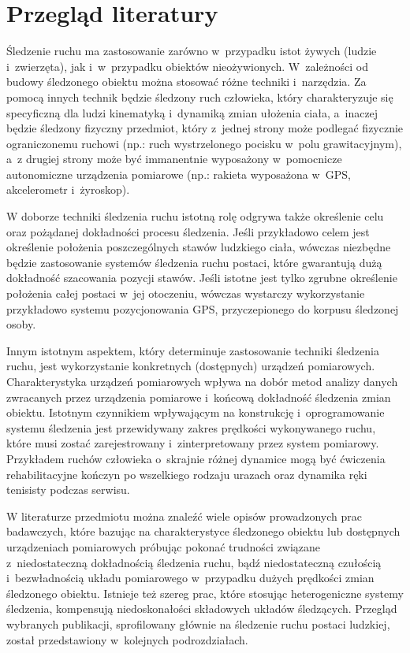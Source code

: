 \chapter{Przegląd literatury}\label{chap:literature}

Śledzenie ruchu ma zastosowanie zarówno w~przypadku istot żywych (ludzie i~zwierzęta), jak i~w~przypadku obiektów nieożywionych. W~zależności od budowy śledzonego obiektu można stosować różne techniki i~narzędzia. Za pomocą innych technik będzie śledzony ruch człowieka, który charakteryzuje się specyficzną dla ludzi kinematyką i~dynamiką zmian ułożenia ciała, a~inaczej będzie śledzony fizyczny przedmiot, który z~jednej strony może podlegać fizycznie ograniczonemu ruchowi (np.: ruch wystrzelonego pocisku w~polu grawitacyjnym), a~z drugiej strony może być immanentnie wyposażony w~pomocnicze autonomiczne urządzenia pomiarowe (np.: rakieta wyposażona w~GPS, akcelerometr i~żyroskop). 

W doborze techniki śledzenia ruchu istotną rolę odgrywa także określenie celu oraz pożądanej dokładności procesu śledzenia. Jeśli przykładowo celem jest określenie położenia poszczególnych stawów ludzkiego ciała, wówczas niezbędne będzie zastosowanie systemów śledzenia ruchu postaci, które gwarantują dużą dokładność szacowania pozycji stawów. Jeśli istotne jest tylko zgrubne określenie położenia całej postaci w~jej otoczeniu, wówczas wystarczy wykorzystanie przykładowo systemu pozycjonowania GPS, przyczepionego do korpusu śledzonej osoby.

Innym istotnym aspektem, który determinuje zastosowanie techniki śledzenia ruchu, jest wykorzystanie konkretnych (dostępnych) urządzeń pomiarowych. Charakterystyka urządzeń pomiarowych wpływa na dobór metod analizy danych zwracanych przez urządzenia pomiarowe i~końcową dokładność śledzenia zmian obiektu. Istotnym czynnikiem wpływającym na konstrukcję i~oprogramowanie systemu śledzenia jest przewidywany zakres prędkości wykonywanego ruchu, które musi zostać zarejestrowany i~zinterpretowany przez system pomiarowy. Przykładem ruchów człowieka o~skrajnie różnej dynamice  mogą być ćwiczenia rehabilitacyjne kończyn po wszelkiego rodzaju urazach oraz dynamika ręki tenisisty podczas serwisu.  

W literaturze przedmiotu można znaleźć wiele opisów prowadzonych prac badawczych, które bazując na charakterystyce śledzonego obiektu lub dostępnych urządzeniach pomiarowych próbując pokonać trudności związane z~niedostateczną dokładnością śledzenia ruchu, bądź niedostateczną czułością i~bezwładnością układu pomiarowego w~przypadku dużych prędkości zmian śledzonego obiektu. Istnieje też szereg prac, które stosując heterogeniczne systemy śledzenia, kompensują niedoskonałości składowych układów śledzących. 
Przegląd wybranych publikacji, sprofilowany głównie na śledzenie ruchu postaci ludzkiej, został przedstawiony w~kolejnych podrozdziałach.


